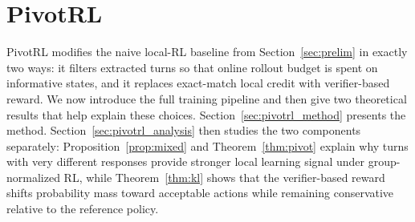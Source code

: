 



\section{PivotRL}
\label{sec:pivotrl}

PivotRL modifies the naive local-RL baseline from Section~\ref{sec:prelim} in exactly two ways: it filters extracted turns so that online rollout budget is spent on informative states, and it replaces exact-match local credit with verifier-based reward. We now introduce the full training pipeline and then give two theoretical results that help explain these choices. Section~\ref{sec:pivotrl_method} presents the method. Section~\ref{sec:pivotrl_analysis} then studies the two components separately: Proposition~\ref{prop:mixed} and Theorem~\ref{thm:pivot} explain why turns with very different responses provide stronger local learning signal under group-normalized RL, while Theorem~\ref{thm:kl} shows that the verifier-based reward shifts probability mass toward acceptable actions while remaining conservative relative to the reference policy.


